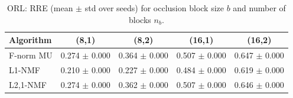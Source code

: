 \begin{table}[t]
\centering
\caption{ORL: RRE (mean $\pm$ std over seeds) for occlusion block size $b$ and number of blocks $n_b$.}
\begin{tabular}{lcccc}
\toprule
Algorithm & (8,1) & (8,2) & (16,1) & (16,2) \\
\midrule
F-norm MU & 0.274 $\pm$ 0.000 & 0.364 $\pm$ 0.000 & 0.507 $\pm$ 0.000 & 0.647 $\pm$ 0.000 \\
L1-NMF & 0.210 $\pm$ 0.000 & 0.227 $\pm$ 0.000 & 0.484 $\pm$ 0.000 & 0.619 $\pm$ 0.000 \\
L2,1-NMF & 0.274 $\pm$ 0.000 & 0.362 $\pm$ 0.000 & 0.507 $\pm$ 0.000 & 0.646 $\pm$ 0.000 \\
\bottomrule
\end{tabular}
\end{table}
